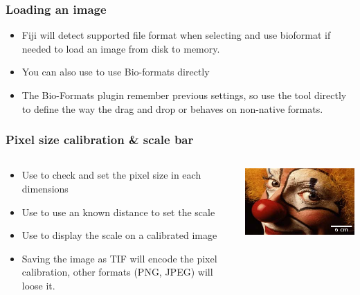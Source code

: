 \documentclass[ignorenonframetext,aspectratio=169,10pt,xcolor=table]{beamer}
\begin{document}
\begin{frame} \frametitle{Loading an image}
  \begin{itemize} \setlength\itemsep{2em}
  \item Fiji will detect supported file format when selecting
     and use bioformat if needed to load an image from
    disk to memory.
  \item You can also use  to use Bio-formats directly
  \item The Bio-Formats plugin remember previous settings, so use
    the tool directly to define the way the drag and drop or
     behaves on non-native formats.
  \end{itemize}
\end{frame}

\begin{frame} \frametitle{Pixel size calibration \& scale bar}

  \begin{columns}

    \begin{column}{0.5\textwidth}
      \begin{itemize} \setlength\itemsep{1em}
      \item Use  to check and set the
        pixel size in each dimensions
      \item Use  to use an known distance
        to set the scale
      \item Use  to display the scale on
        a calibrated image
      \item Saving the image as TIF will encode the pixel calibration, other
      formats (PNG, JPEG) will loose it.
      \end{itemize}
    \end{column}

    \begin{column}{0.5\textwidth}
      \includegraphics[width=\textwidth]{clown-scale}
    \end{column}

  \end{columns}

\end{frame}
\end{document}
